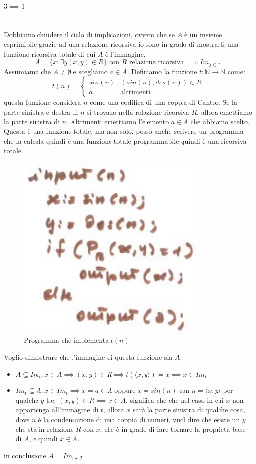 \documentclass{article}
\begin{document}
\paragraph{$3\implies 1$}\mbox{}\\
Dobbiamo chiudere il ciclo di implicazioni, ovvero che se $A$ è un insieme esprimibile grazie
ad una relazione ricorsiva io sono in grado di mostrarti una funzione ricorsiva totale di cui $A$
è l'immagine.
$$A=\{x:\exists y(x,y)\in R\}\text{ con }R \text{ relazione ricorsiva }\implies Im_{f\in\mathcal{T}}$$
Assumiamo che $A\neq\emptyset$ e scegliamo $a\in A$. Definiamo la funzione $t:\mathbb{N}\rightarrow\mathbb{N}$ come:
\[
    t(n)=
    \begin{cases}
        sin(n) & (sin(n), des(n))\in R \\
        a      & \text{altrimenti}
    \end{cases}
\]
questa funzione considera $n$ come una codifica di una coppia di Cantor. Se la parte sinistra e destra di $n$
si trovano nella relazione ricorsiva $R$, allora emettiamo la parte sinistra di $n$. Altrimenti emettiamo
l'elemento $a\in A$ che abbiamo scelto. Questa è una funzione totale, ma non solo, posso anche
scrivere un programma che la calcola quindi è una funzione totale programmabile quindi è una ricorsiva
totale.
\begin{figure}[H]
    \centering
    \includegraphics[scale=0.4]{images/tdin.png}
    \caption{Programma che implementa $t(n)$}
\end{figure}
Voglio dimostrare che l'immagine di questa funzione sia $A$:
\begin{itemize}
    \item $A\subseteq Im_t:x\in A\implies (x,y)\in R\implies t(\langle x,y\rangle)=x\implies x\in Im_t$
    \item $Im_t\subseteq A: x\in Im_t\implies x=a\in A$ oppure $x=sin(n)$ con $n=\langle x,y\rangle$
          per qualche $y$ t.c. $(x,y)\in R\implies x\in A$.
          significa che che nel caso in cui $x$ non appartenga all'immagine di $t$, allora $x$ sarà la parte sinistra di qualche cosa, dove $n$ è la condensazione di una coppia di numeri,
          vuol dire che esiste un $y$ che sta in relazione $R$ con $x$, che è in grado di fare tornare la proprietà
          base di $A$, e quindi $x\in A$.
\end{itemize}
in conclusione $A=Im_{t\in\mathcal{T}}$
\end{document}
